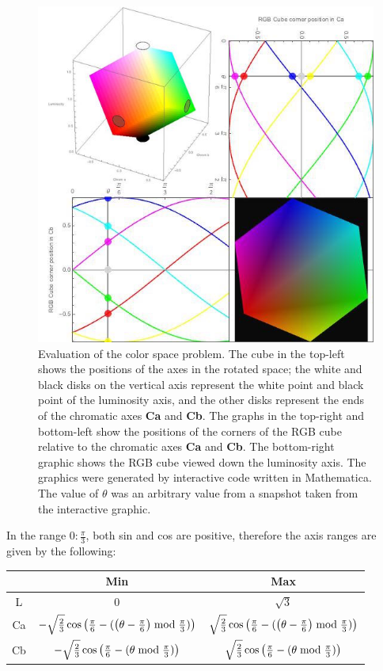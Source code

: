 \begin{figure}[h!]
  \centering
    \includegraphics[width=\textwidth]{Chapter2/Figs/CornersOf_theRGBCube.jpg}
    \caption{Evaluation of the color space problem. The cube in the top-left shows the positions of the axes in the rotated space; the white and black disks on the vertical axis represent the white point and black point of the luminosity axis, and the other disks represent the ends of the chromatic axes \textbf{Ca} and \textbf{Cb}. The graphs in the top-right and bottom-left show the positions of the corners of the RGB cube relative to the chromatic axes \textbf{Ca} and \textbf{Cb}. The bottom-right graphic shows the RGB cube viewed down the luminosity axis. The graphics were generated by interactive code written in Mathematica. The value of $\theta$ was an arbitrary value from a snapshot taken from the interactive graphic.}\label{fig:YABCubeEval}
\end{figure}

In the range $0:\frac{\pi}{3}$, both sin and cos are positive, therefore the axis ranges are given by the following:

\begin{tabular}{|c|c|c|}
  \hline
    & Min & Max \\ \hline
  L & \(0\) & \(\sqrt{3}\) \\
  Ca & \(- \sqrt{\frac{2}{3}} \cos \left(\frac{\pi}{6}-(\left(\theta -\frac{\pi}{6}\right) \bmod \frac{\pi }{3})\right) \)&\( \sqrt{\frac{2}{3}} \cos \left(\frac{\pi}{6}-(\left(\theta -\frac{\pi}{6}\right) \bmod \frac{\pi }{3})\right) \)\\
 Cb & \(-\sqrt{\frac{2}{3}} \cos \left(\frac{\pi}{6}-(\theta  \bmod \frac{\pi }{3})\right) \)&\( \sqrt{\frac{2}{3}} \cos \left(\frac{\pi}{6}-(\theta  \bmod \frac{\pi }{3})\right) \)\\
  \hline
\end{tabular}


